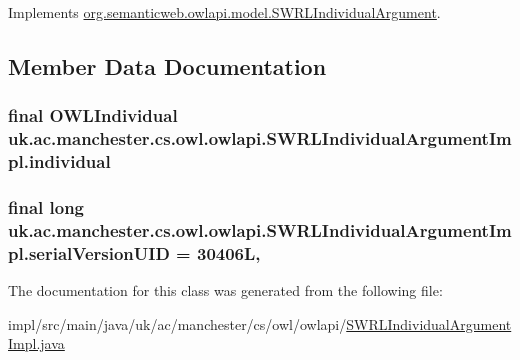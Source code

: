 Implements \hyperlink{interfaceorg_1_1semanticweb_1_1owlapi_1_1model_1_1_s_w_r_l_individual_argument_aac90710c937c4718c9df06a4059df814}{org.\-semanticweb.\-owlapi.\-model.\-S\-W\-R\-L\-Individual\-Argument}.



\subsection{Member Data Documentation}
\hypertarget{classuk_1_1ac_1_1manchester_1_1cs_1_1owl_1_1owlapi_1_1_s_w_r_l_individual_argument_impl_aa1f847148e8de013c222004724cbe622}{
\subsubsection[{individual}]{\setlength{\rightskip}{0pt plus 5cm}final {\bf O\-W\-L\-Individual} uk.\-ac.\-manchester.\-cs.\-owl.\-owlapi.\-S\-W\-R\-L\-Individual\-Argument\-Impl.\-individual\hspace{0.3cm}{\ttfamily [private]}}}\label{classuk_1_1ac_1_1manchester_1_1cs_1_1owl_1_1owlapi_1_1_s_w_r_l_individual_argument_impl_aa1f847148e8de013c222004724cbe622}
\hypertarget{classuk_1_1ac_1_1manchester_1_1cs_1_1owl_1_1owlapi_1_1_s_w_r_l_individual_argument_impl_a33e2cc3aa04be13b2fcb5dfaa82da0ab}{
\subsubsection[{serial\-Version\-U\-I\-D}]{\setlength{\rightskip}{0pt plus 5cm}final long uk.\-ac.\-manchester.\-cs.\-owl.\-owlapi.\-S\-W\-R\-L\-Individual\-Argument\-Impl.\-serial\-Version\-U\-I\-D = 30406\-L\hspace{0.3cm}{\ttfamily [static]}, {\ttfamily [private]}}}\label{classuk_1_1ac_1_1manchester_1_1cs_1_1owl_1_1owlapi_1_1_s_w_r_l_individual_argument_impl_a33e2cc3aa04be13b2fcb5dfaa82da0ab}


The documentation for this class was generated from the following file\-:\begin{DoxyCompactItemize}
\item 
impl/src/main/java/uk/ac/manchester/cs/owl/owlapi/\hyperlink{_s_w_r_l_individual_argument_impl_8java}{S\-W\-R\-L\-Individual\-Argument\-Impl.\-java}\end{DoxyCompactItemize}

